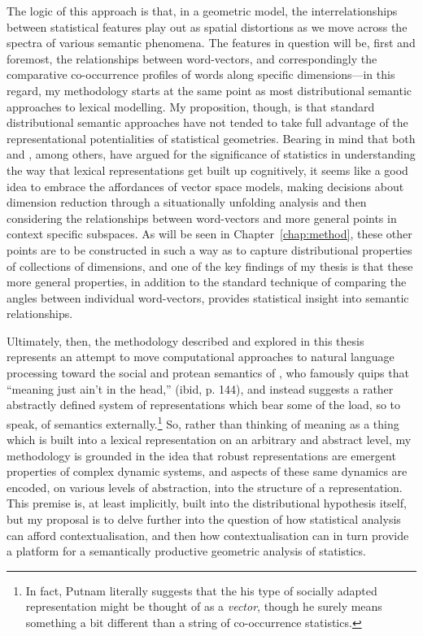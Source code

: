 The logic of this approach is that, in a geometric model, the interrelationships between statistical features play out as spatial distortions as we move across the spectra of various semantic phenomena.  The features in question will be, first and foremost, the relationships between word-vectors, and correspondingly the comparative co-occurrence profiles of words along specific dimensions---in this regard, my methodology starts at the same point as most distributional semantic approaches to lexical modelling.  My proposition, though, is that standard distributional semantic approaches have not tended to take full advantage of the representational potentialities of statistical geometries.  Bearing in mind that both \cite{Barsalou2008} and \cite{Evans2009}, among others, have argued for the significance of statistics in understanding the way that lexical representations get built up cognitively, it seems like a good idea to embrace the affordances of vector space models, making decisions about dimension reduction through a situationally unfolding analysis and then considering the relationships between word-vectors and more general points in context specific subspaces.  As will be seen in Chapter~\ref{chap:method}, these other points are to be constructed in such a way as to capture distributional properties of collections of dimensions, and one of the key findings of my thesis is that these more general properties, in addition to the standard technique of comparing the angles between individual word-vectors, provides statistical insight into semantic relationships.

Ultimately, then, the methodology described and explored in this thesis represents an attempt to move computational approaches to natural language processing toward the social and protean semantics of \cite{Putnam1975}, who famously quips that ``meaning just ain't in the head,'' (ibid, p. 144), and instead suggests a rather abstractly defined system of representations which bear some of the load, so to speak, of semantics externally.\footnote{In fact, Putnam literally suggests that the his type of socially adapted representation might be thought of as a \emph{vector}, though he surely means something a bit different than a string of co-occurrence statistics.}  So, rather than thinking of meaning as a thing which is built into a lexical representation on an arbitrary and abstract level, my methodology is grounded in the idea that robust representations are emergent properties of complex dynamic systems, and aspects of these same dynamics are encoded, on various levels of abstraction, into the structure of a representation.  This premise is, at least implicitly, built into the distributional hypothesis itself, but my proposal is to delve further into the question of how statistical analysis can afford contextualisation, and then how contextualisation can in turn provide a platform for a semantically productive geometric analysis of statistics.


